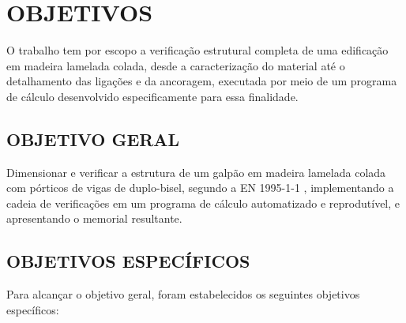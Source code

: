 
\chapter{OBJETIVOS}\label{cap:objetivos}

O trabalho tem por escopo a verificação estrutural completa de uma edificação
em madeira lamelada colada, desde a caracterização do material até o
detalhamento das ligações e da ancoragem, executada por meio de um programa de
cálculo desenvolvido especificamente para essa finalidade.

\section{OBJETIVO GERAL}\label{sec:objetivo-geral}

Dimensionar e verificar a estrutura de um galpão em madeira lamelada colada com
pórticos de vigas de duplo-bisel, segundo a EN 1995-1-1 \cite{EN1995-1-1:2004},
implementando a cadeia de verificações em um programa de cálculo automatizado e
reprodutível, e apresentando o memorial resultante.

\section{OBJETIVOS ESPECÍFICOS}\label{sec:objetivos-especificos}

Para alcançar o objetivo geral, foram estabelecidos os seguintes objetivos
específicos:

